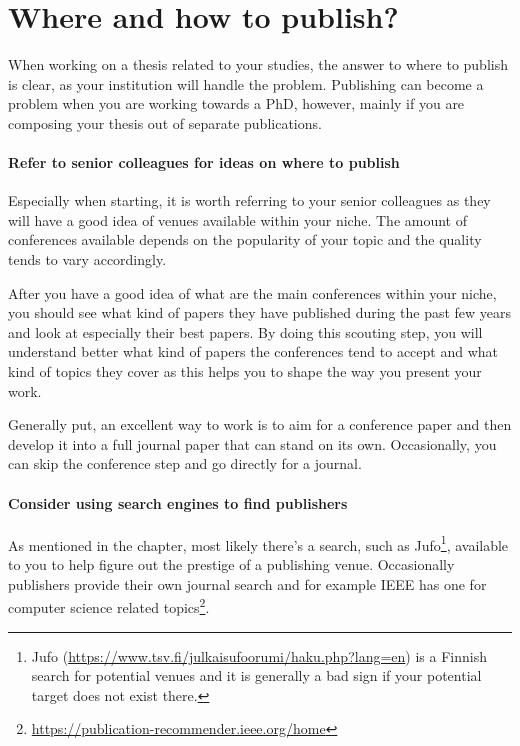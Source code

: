 
\section{Where and how to publish?}

When working on a thesis related to your studies, the answer to where to publish is clear, as your institution will handle the problem.
Publishing can become a problem when you are working towards a PhD, however, mainly if you are composing your thesis out of separate publications.

\paragraph{Refer to senior colleagues for ideas on where to publish}
Especially when starting, it is worth referring to your senior colleagues as they will have a good idea of venues available within your niche.
The amount of conferences available depends on the popularity of your topic and the quality tends to vary accordingly.

After you have a good idea of what are the main conferences within your niche, you should see what kind of papers they have published during the past few years and look at especially their best papers.
By doing this scouting step, you will understand better what kind of papers the conferences tend to accept and what kind of topics they cover as this helps you to shape the way you present your work.

Generally put, an excellent way to work is to aim for a conference paper and then develop it into a full journal paper that can stand on its own.
Occasionally, you can skip the conference step and go directly for a journal.

\paragraph{Consider using search engines to find publishers}
As mentioned in the  chapter, most likely there's a search, such as Jufo\footnote{Jufo (\url{https://www.tsv.fi/julkaisufoorumi/haku.php?lang=en}) is a Finnish search for potential venues and it is generally a bad sign if your potential target does not exist there.}, available to you to help figure out the prestige of a publishing venue.
Occasionally publishers provide their own journal search and for example IEEE has one for computer science related topics\footnote{\url{https://publication-recommender.ieee.org/home}}.

